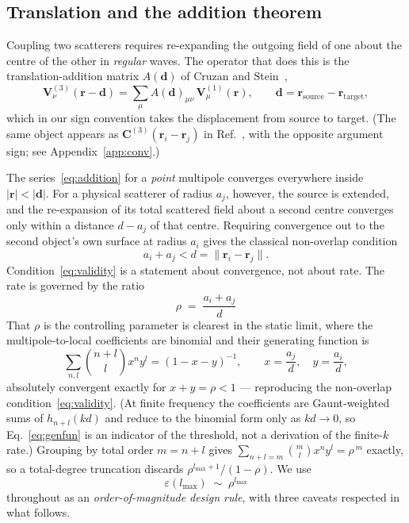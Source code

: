 \documentclass[11pt,a4paper]{article}
\newcommand{\lmax}{\ensuremath{l_{\max}}}
\newcommand{\rvec}{\ensuremath{\mathbf{r}}}
\theoremstyle{plain}
\theoremstyle{definition}
\begin{document}
\subsection{Translation and the addition theorem}
\label{sec:addition}

Coupling two scatterers requires re-expanding the outgoing field of one about the
centre of the other in \emph{regular} waves. The operator that does this is the
translation-addition matrix $A(\mathbf{d})$ of Cruzan and
Stein~\cite{cruzan1962,stein1961},
\begin{equation}
  \mathbf{V}^{(3)}_\nu(\rvec - \mathbf{d})
    = \sum_\mu A(\mathbf{d})_{\mu\nu}\,\mathbf{V}^{(1)}_\mu(\rvec),
  \qquad \mathbf{d} = \rvec_{\text{source}} - \rvec_{\text{target}} ,
  \label{eq:addition}
\end{equation}
which in our sign convention takes the displacement from source to target. (The
same object appears as $\mathbf{C}^{(3)}(\rvec_i - \rvec_j)$ in
Ref.~\cite{beutel2024}, with the opposite argument sign; see
Appendix~\ref{app:conv}.)

The series~\eqref{eq:addition} for a \emph{point} multipole converges everywhere
inside $|\rvec| < |\mathbf{d}|$. For a physical scatterer of radius $a_j$,
however, the source is extended, and the re-expansion of its total scattered
field about a second centre converges only within a distance $d - a_j$ of that
centre. Requiring convergence out to the second object's own surface at radius
$a_i$ gives the classical non-overlap condition
\begin{equation}
  a_i + a_j < d = \|\rvec_i - \rvec_j\| .
  \label{eq:validity}
\end{equation}
Condition~\eqref{eq:validity} is a statement about convergence, not about rate.
The rate is governed by the ratio
\begin{equation}
  \boxed{\;\rho \;=\; \frac{a_i + a_j}{d}\;}
  \label{eq:rho}
\end{equation}
That $\rho$ is the controlling parameter is clearest in the static limit, where
the multipole-to-local coefficients are binomial and their generating function is
\begin{equation}
  \sum_{n,l}\binom{n+l}{l} x^{n} y^{l} = (1 - x - y)^{-1},
  \qquad x = \frac{a_j}{d},\quad y = \frac{a_i}{d},
  \label{eq:genfun}
\end{equation}
absolutely convergent exactly for $x + y = \rho < 1$ --- reproducing the
non-overlap condition~\eqref{eq:validity}. (At finite frequency the coefficients
are Gaunt-weighted sums of $h_{n+l}(kd)$ and reduce to the binomial form only as
$kd \to 0$, so Eq.~\eqref{eq:genfun} is an indicator of the threshold, not a
derivation of the finite-$k$ rate.) Grouping by total order $m = n + l$ gives
$\sum_{n+l=m}\binom{m}{l}x^n y^l = \rho^{\,m}$ exactly, so a total-degree
truncation discards $\rho^{\lmax+1}/(1-\rho)$. We use
\begin{equation}
  \varepsilon(\lmax) \;\sim\; \rho^{\lmax}
  \label{eq:rate}
\end{equation}
throughout as an \emph{order-of-magnitude design rule}, with three caveats
respected in what follows.
\end{document}
